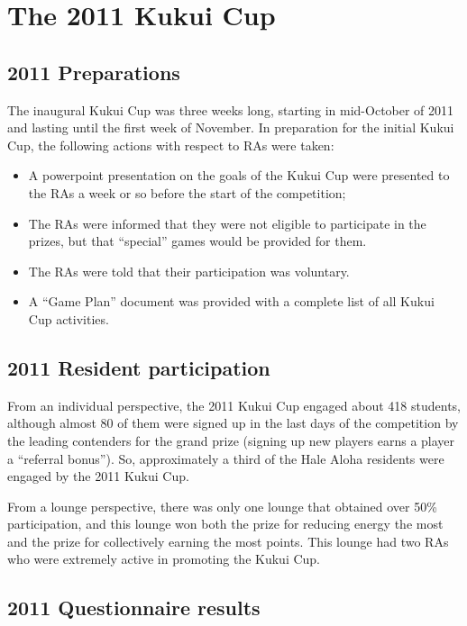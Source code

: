 \documentclass[]{IEEEconf}
\begin{document}
\section{The 2011 Kukui Cup}

\subsection{2011 Preparations}

The inaugural Kukui Cup was three weeks long, starting in mid-October of 2011 and lasting
until the first week of November.  In preparation for the initial Kukui Cup, the following
actions with respect to RAs were taken:

\begin{itemize}[nolistsep]
\item A powerpoint presentation on the goals of the Kukui Cup were presented to the RAs a
  week or so before the start of the competition;
\item The RAs were informed that they were not eligible to participate in the prizes, but
  that ``special'' games would be provided for them.
\item The RAs were told that their participation was voluntary. 
\item A ``Game Plan'' document was provided with a complete list of all Kukui Cup activities.
\end{itemize}

\subsection{2011 Resident participation}

From an individual perspective, the 2011 Kukui Cup engaged about 418 students, although almost 80 of them were signed up in the
last days of the competition by the leading contenders for the grand prize (signing up new
players earns a player a ``referral bonus'').  So, approximately a third of the Hale Aloha
residents were engaged by the 2011 Kukui Cup.  

From a lounge perspective, there was only one lounge that obtained over 50\%
participation, and this lounge won both the prize for reducing energy the most and the
prize for collectively earning the most points.   This lounge had two RAs
who were extremely active in promoting the Kukui Cup. 

\subsection{2011 Questionnaire results}
\end{document}
